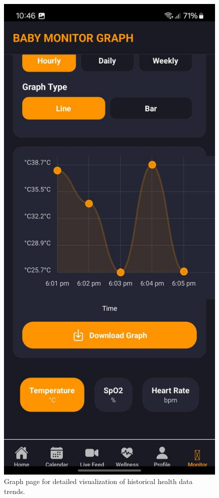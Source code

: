 \documentclass[12pt,a4paper]{report}
\begin{document}
\begin{figure}[htbp]
  \centering
  \includegraphics[scale=0.2]{./pic/graphs.jpeg}
  \caption{Graph page for detailed visualization of historical health data trends.}
  \label{fig:graph}
\end{figure}
\end{document}
